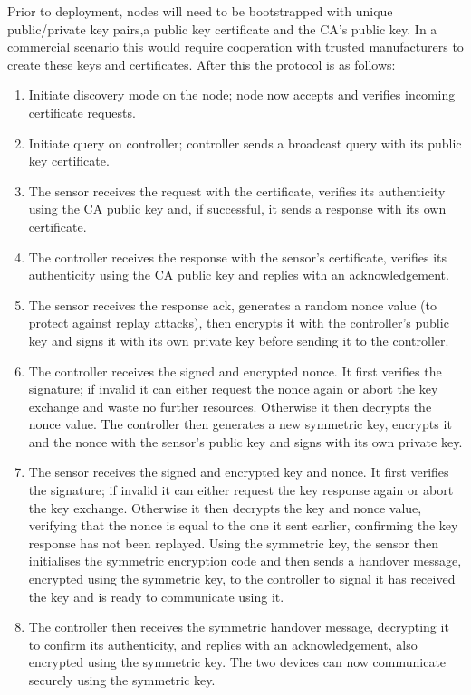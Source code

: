 \documentclass[conference]{./sty/IEEEtran}
\begin{document}
Prior to deployment, nodes will need to be bootstrapped with unique public/private key pairs,a public key certificate and the CA's public key. In a commercial scenario this would require cooperation with trusted manufacturers to create these keys and certificates. After this the protocol is as follows:
\begin{enumerate}
  \item Initiate discovery mode on the node; node now accepts and verifies incoming certificate requests.
  \item Initiate query on controller; controller sends a broadcast query with its public key certificate.
  \item The sensor receives the request with the certificate, verifies its authenticity using the CA public key and, if successful, it sends a response with its own certificate.
  \item The controller receives the response with the sensor's certificate, verifies its authenticity using the CA public key and replies with an acknowledgement.
  \item The sensor receives the response ack, generates a random nonce value (to protect against replay attacks), then encrypts it with the controller's public key and signs it with its own private key before sending it to the controller.
  \item The controller receives the signed and encrypted nonce. It first verifies the signature; if invalid it can either request the nonce again or abort the key exchange and waste no further resources. Otherwise it then decrypts the nonce value. The controller then generates a new symmetric key, encrypts it and the nonce with the sensor's public key and signs with its own private key.
  \item The sensor receives the signed and encrypted key and nonce. It first verifies the signature; if invalid it can either request the key response again or abort the key exchange. Otherwise it then decrypts the key and nonce value, verifying that the nonce is equal to the one it sent earlier, confirming the key response has not been replayed. Using the symmetric key, the sensor then initialises the symmetric encryption code and then sends a handover message, encrypted using the symmetric key, to the controller to signal it has received the key and is ready to communicate using it.
  \item The controller then receives the symmetric handover message, decrypting it to confirm its authenticity, and replies with an acknowledgement, also encrypted using the symmetric key. The two devices can now communicate securely using the symmetric key.
\end{enumerate} 
\end{document}
